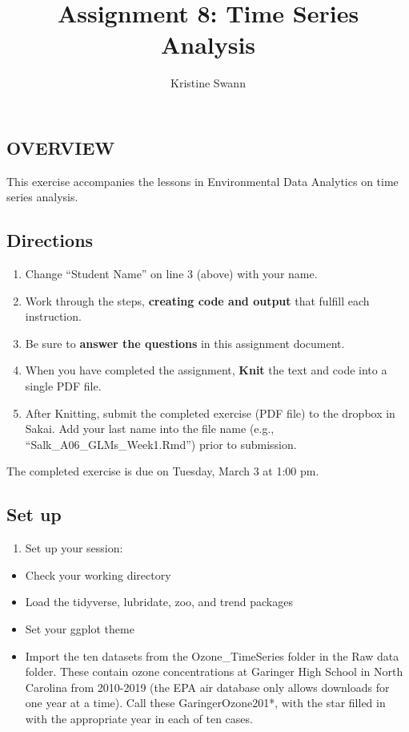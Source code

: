 \documentclass[
]{article}
\title{Assignment 8: Time Series Analysis}
\author{Kristine Swann}
\date{}
\providecommand{\tightlist}{%
  \setlength{\itemsep}{0pt}\setlength{\parskip}{0pt}}
\begin{document}
\maketitle

\hypertarget{overview}{%
\subsection{OVERVIEW}\label{overview}}

This exercise accompanies the lessons in Environmental Data Analytics on
time series analysis.

\hypertarget{directions}{%
\subsection{Directions}\label{directions}}

\begin{enumerate}
\def\labelenumi{\arabic{enumi}.}
\tightlist
\item
  Change ``Student Name'' on line 3 (above) with your name.
\item
  Work through the steps, \textbf{creating code and output} that fulfill
  each instruction.
\item
  Be sure to \textbf{answer the questions} in this assignment document.
\item
  When you have completed the assignment, \textbf{Knit} the text and
  code into a single PDF file.
\item
  After Knitting, submit the completed exercise (PDF file) to the
  dropbox in Sakai. Add your last name into the file name (e.g.,
  ``Salk\_A06\_GLMs\_Week1.Rmd'') prior to submission.
\end{enumerate}

The completed exercise is due on Tuesday, March 3 at 1:00 pm.

\hypertarget{set-up}{%
\subsection{Set up}\label{set-up}}

\begin{enumerate}
\def\labelenumi{\arabic{enumi}.}
\tightlist
\item
  Set up your session:
\end{enumerate}

\begin{itemize}
\tightlist
\item
  Check your working directory
\item
  Load the tidyverse, lubridate, zoo, and trend packages
\item
  Set your ggplot theme
\item
  Import the ten datasets from the Ozone\_TimeSeries folder in the Raw
  data folder. These contain ozone concentrations at Garinger High
  School in North Carolina from 2010-2019 (the EPA air database only
  allows downloads for one year at a time). Call these
  GaringerOzone201*, with the star filled in with the appropriate year
  in each of ten cases.
\end{itemize}
\end{document}
